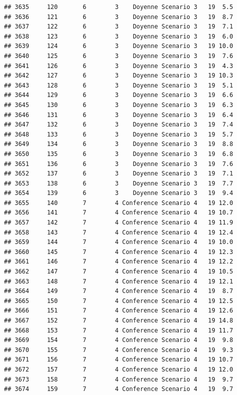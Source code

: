 \documentclass[
]{article}
\begin{document}
\begin{verbatim}
## 3635     120       6        3    Doyenne Scenario 3   19  5.5
## 3636     121       6        3    Doyenne Scenario 3   19  8.7
## 3637     122       6        3    Doyenne Scenario 3   19  7.1
## 3638     123       6        3    Doyenne Scenario 3   19  6.0
## 3639     124       6        3    Doyenne Scenario 3   19 10.0
## 3640     125       6        3    Doyenne Scenario 3   19  7.6
## 3641     126       6        3    Doyenne Scenario 3   19  4.3
## 3642     127       6        3    Doyenne Scenario 3   19 10.3
## 3643     128       6        3    Doyenne Scenario 3   19  5.1
## 3644     129       6        3    Doyenne Scenario 3   19  6.6
## 3645     130       6        3    Doyenne Scenario 3   19  6.3
## 3646     131       6        3    Doyenne Scenario 3   19  6.4
## 3647     132       6        3    Doyenne Scenario 3   19  7.4
## 3648     133       6        3    Doyenne Scenario 3   19  5.7
## 3649     134       6        3    Doyenne Scenario 3   19  8.8
## 3650     135       6        3    Doyenne Scenario 3   19  6.8
## 3651     136       6        3    Doyenne Scenario 3   19  7.6
## 3652     137       6        3    Doyenne Scenario 3   19  7.1
## 3653     138       6        3    Doyenne Scenario 3   19  7.7
## 3654     139       6        3    Doyenne Scenario 3   19  9.4
## 3655     140       7        4 Conference Scenario 4   19 12.0
## 3656     141       7        4 Conference Scenario 4   19 10.7
## 3657     142       7        4 Conference Scenario 4   19 11.9
## 3658     143       7        4 Conference Scenario 4   19 12.4
## 3659     144       7        4 Conference Scenario 4   19 10.0
## 3660     145       7        4 Conference Scenario 4   19 12.3
## 3661     146       7        4 Conference Scenario 4   19 12.2
## 3662     147       7        4 Conference Scenario 4   19 10.5
## 3663     148       7        4 Conference Scenario 4   19 12.1
## 3664     149       7        4 Conference Scenario 4   19  8.7
## 3665     150       7        4 Conference Scenario 4   19 12.5
## 3666     151       7        4 Conference Scenario 4   19 12.6
## 3667     152       7        4 Conference Scenario 4   19 14.8
## 3668     153       7        4 Conference Scenario 4   19 11.7
## 3669     154       7        4 Conference Scenario 4   19  9.8
## 3670     155       7        4 Conference Scenario 4   19  9.3
## 3671     156       7        4 Conference Scenario 4   19 10.7
## 3672     157       7        4 Conference Scenario 4   19 12.0
## 3673     158       7        4 Conference Scenario 4   19  9.7
## 3674     159       7        4 Conference Scenario 4   19  9.7

\end{verbatim}
\end{document}
